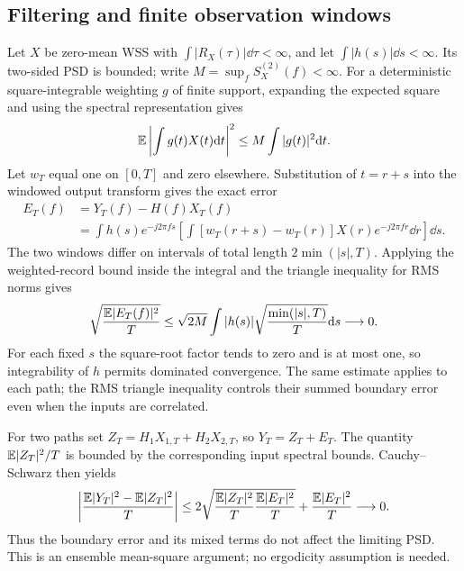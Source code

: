 \subsection{Filtering and finite observation windows}
\label{app:window-filter}
Let $X$ be zero-mean WSS with $\int|R_X(\tau)|\dd\tau<\infty$, and let $\int|h(s)|\dd s<\infty$. Its two-sided PSD is bounded; write $M=\sup_f S_X^{(2)}(f)<\infty$. For a deterministic square-integrable weighting $g$ of finite support, expanding the expected square and using the spectral representation gives
\[
\mathbb E\left|\int g(t)X(t)\mathrm d t\right|^2
\leq M\int|g(t)|^2\mathrm d t.
\]
Let $w_T$ equal one on $[0,T]$ and zero elsewhere. Substitution of $t=r+s$ into the windowed output transform gives the exact error
\begin{align*}
E_T(f)&=Y_T(f)-H(f)X_T(f)\\
&=\int h(s)e^{-j2\pi fs}
\left[\int [w_T(r+s)-w_T(r)]X(r)e^{-j2\pi fr}\dd r\right]\dd s.
\end{align*}
The two windows differ on intervals of total length $2\min(|s|,T)$. Applying the weighted-record bound inside the integral and the triangle inequality for RMS norms gives
\[
\sqrt{\frac{\mathbb E|E_T(f)|^2}{T}}
\leq\sqrt{2M}\int|h(s)|\sqrt{\frac{\min(|s|,T)}{T}}\mathrm d s
\longrightarrow0.
\]
For each fixed $s$ the square-root factor tends to zero and is at most one, so integrability of $h$ permits dominated convergence. The same estimate applies to each path; the RMS triangle inequality controls their summed boundary error even when the inputs are correlated.

For two paths set $Z_T=H_1X_{1,T}+H_2X_{2,T}$, so $Y_T=Z_T+E_T$. The quantity $\mathbb E|Z_T|^2/T$ is bounded by the corresponding input spectral bounds. Cauchy--Schwarz then yields
\[
\left|\frac{\mathbb E|Y_T|^2-\mathbb E|Z_T|^2}{T}\right|
\leq2\sqrt{\frac{\mathbb E|Z_T|^2}{T}\frac{\mathbb E|E_T|^2}{T}}
+\frac{\mathbb E|E_T|^2}{T}\longrightarrow0.
\]
Thus the boundary error and its mixed terms do not affect the limiting PSD. This is an ensemble mean-square argument; no ergodicity assumption is needed.
